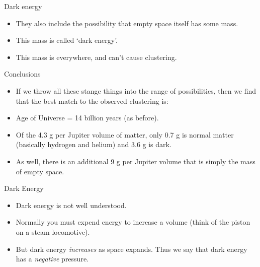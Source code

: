 \documentclass[usenames,dvipsnames]{beamer}
\begin{document}
\begin{frame}{Dark energy}
  \begin{block}{}
    \begin{itemize}
      \item{They also include the possibility that empty space itself has some mass.}
	\item{This mass is called `dark energy'.}
      \item{This mass is everywhere, and can't cause clustering.}
    \end{itemize}
  \end{block}
\end{frame}
      
\begin{frame}{Conclusions}
  \begin{block}{}
    \begin{itemize}
      \item{If we throw all these stange things into the range of possibilities, then we find that the best match to the observed clustering is:}
	\item{Age of Universe = 14 billion years (as before).}
      \item{Of the 4.3 g per Jupiter volume of matter, only 0.7 g is normal matter (basically hydrogen and helium) and 3.6 g is dark.}
      \item{As well, there is an additional 9 g per Jupiter volume that is simply the mass of empty space.}
    \end{itemize}
  \end{block}
\end{frame}

\begin{frame}{Dark Energy}
  \begin{block}{}
    \begin{itemize}
      \item{Dark energy is not well understood.}
	\item{Normally you must expend energy to increase a volume (think of the piston on a steam locomotive).}
      \item{But dark energy \textit{increases} as space expands. Thus we say that dark energy has a \textit{negative} pressure.}
    \end{itemize}
  \end{block}
\end{frame}
\end{document}
